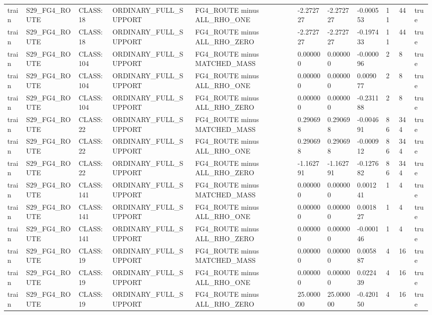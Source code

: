\begin{tabular}{lllllllllll}
train & S29\_FG4\_ROUTE & CLASS:18 & ORDINARY\_FULL\_SUPPORT & FG4\_ROUTE minus ALL\_RHO\_ONE & -2.272727 & -2.272727 & -0.000553 & 11 & 44 & true \\
train & S29\_FG4\_ROUTE & CLASS:18 & ORDINARY\_FULL\_SUPPORT & FG4\_ROUTE minus ALL\_RHO\_ZERO & -2.272727 & -2.272727 & -0.197433 & 11 & 44 & true \\
train & S29\_FG4\_ROUTE & CLASS:104 & ORDINARY\_FULL\_SUPPORT & FG4\_ROUTE minus MATCHED\_MASS & 0.000000 & 0.000000 & -0.000096 & 2 & 8 & true \\
train & S29\_FG4\_ROUTE & CLASS:104 & ORDINARY\_FULL\_SUPPORT & FG4\_ROUTE minus ALL\_RHO\_ONE & 0.000000 & 0.000000 & 0.009077 & 2 & 8 & true \\
train & S29\_FG4\_ROUTE & CLASS:104 & ORDINARY\_FULL\_SUPPORT & FG4\_ROUTE minus ALL\_RHO\_ZERO & 0.000000 & 0.000000 & -0.231188 & 2 & 8 & true \\
train & S29\_FG4\_ROUTE & CLASS:22 & ORDINARY\_FULL\_SUPPORT & FG4\_ROUTE minus MATCHED\_MASS & 0.290698 & 0.290698 & -0.004691 & 86 & 344 & true \\
train & S29\_FG4\_ROUTE & CLASS:22 & ORDINARY\_FULL\_SUPPORT & FG4\_ROUTE minus ALL\_RHO\_ONE & 0.290698 & 0.290698 & -0.000912 & 86 & 344 & true \\
train & S29\_FG4\_ROUTE & CLASS:22 & ORDINARY\_FULL\_SUPPORT & FG4\_ROUTE minus ALL\_RHO\_ZERO & -1.162791 & -1.162791 & -0.127682 & 86 & 344 & true \\
train & S29\_FG4\_ROUTE & CLASS:141 & ORDINARY\_FULL\_SUPPORT & FG4\_ROUTE minus MATCHED\_MASS & 0.000000 & 0.000000 & 0.001241 & 1 & 4 & true \\
train & S29\_FG4\_ROUTE & CLASS:141 & ORDINARY\_FULL\_SUPPORT & FG4\_ROUTE minus ALL\_RHO\_ONE & 0.000000 & 0.000000 & 0.001827 & 1 & 4 & true \\
train & S29\_FG4\_ROUTE & CLASS:141 & ORDINARY\_FULL\_SUPPORT & FG4\_ROUTE minus ALL\_RHO\_ZERO & 0.000000 & 0.000000 & -0.000146 & 1 & 4 & true \\
train & S29\_FG4\_ROUTE & CLASS:19 & ORDINARY\_FULL\_SUPPORT & FG4\_ROUTE minus MATCHED\_MASS & 0.000000 & 0.000000 & 0.005887 & 4 & 16 & true \\
train & S29\_FG4\_ROUTE & CLASS:19 & ORDINARY\_FULL\_SUPPORT & FG4\_ROUTE minus ALL\_RHO\_ONE & 0.000000 & 0.000000 & 0.022439 & 4 & 16 & true \\
train & S29\_FG4\_ROUTE & CLASS:19 & ORDINARY\_FULL\_SUPPORT & FG4\_ROUTE minus ALL\_RHO\_ZERO & 25.000000 & 25.000000 & -0.420150 & 4 & 16 & true \\

\end{tabular}
